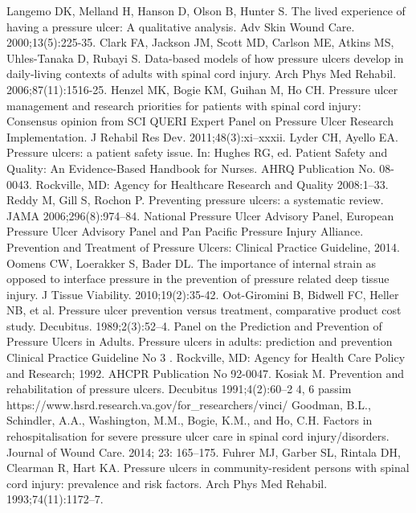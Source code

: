 \documentclass{amia}
\begin{document}
{\footnotesize

\begin{thebibliography}{1}
\setlength\itemsep{-0.1em}

Langemo DK, Melland H, Hanson D, Olson B, Hunter S. The lived experience of having a pressure ulcer: A qualitative analysis. Adv Skin Wound Care. 2000;13(5):225-35.
Clark FA, Jackson JM, Scott MD, Carlson ME, Atkins MS, Uhles-Tanaka D, Rubayi S. Data-based models of how pressure ulcers develop in daily-living contexts of adults with spinal cord injury. Arch Phys Med Rehabil. 2006;87(11):1516-25.
Henzel MK, Bogie KM, Guihan M, Ho CH. Pressure ulcer management and research priorities for patients with spinal cord injury: Consensus opinion from SCI QUERI Expert Panel on Pressure Ulcer Research Implementation. J Rehabil Res Dev. 2011;48(3):xi–xxxii.
Lyder CH, Ayello EA. Pressure ulcers: a patient safety issue. In: Hughes RG, ed. Patient Safety and Quality: An Evidence-Based Handbook for Nurses. AHRQ Publication No. 08-0043. Rockville, MD: Agency for Healthcare Research and Quality 2008:1–33.
Reddy M, Gill S, Rochon P. Preventing pressure ulcers: a systematic review. JAMA 2006;296(8):974–84.
National Pressure Ulcer Advisory Panel, European Pressure Ulcer Advisory Panel and Pan Pacific Pressure Injury Alliance. Prevention and Treatment of Pressure Ulcers: Clinical Practice Guideline, 2014.
Oomens CW, Loerakker S, Bader DL. The importance of internal strain as opposed to interface pressure in the prevention of pressure related deep tissue injury. J Tissue Viability. 2010;19(2):35-42.
Oot-Giromini B, Bidwell FC, Heller NB, et al. Pressure ulcer prevention versus treatment, comparative product cost study. Decubitus. 1989;2(3):52–4.
Panel on the Prediction and Prevention of Pressure Ulcers in Adults. Pressure ulcers in adults: prediction and prevention Clinical Practice Guideline No 3 . Rockville, MD: Agency for Health Care Policy and Research; 1992. AHCPR Publication No 92-0047.
Kosiak M. Prevention and rehabilitation of pressure ulcers. Decubitus 1991;4(2):60–2 4, 6 passim
https://www.hsrd.research.va.gov/for\_researchers/vinci/
Goodman, B.L., Schindler, A.A., Washington, M.M., Bogie, K.M., and Ho, C.H. Factors in rehospitalisation for severe pressure ulcer care in spinal cord injury/disorders. Journal of Wound Care. 2014; 23: 165–175.
Fuhrer MJ, Garber SL, Rintala DH, Clearman R, Hart KA. Pressure ulcers in community-resident persons with spinal cord injury: prevalence and risk factors. Arch Phys Med Rehabil. 1993;74(11):1172–7.

\end{thebibliography}}
\end{document}
